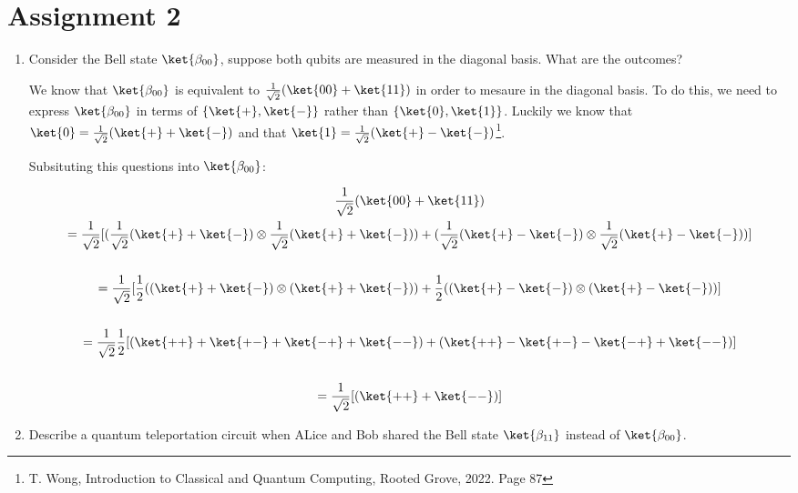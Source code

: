 \documentclass[]{article}
\begin{document}
  \section*{Assignment 2}
    \begin{enumerate}
      \item Consider the Bell state $\ket{\beta_{00}}$, suppose both qubits are measured in the diagonal basis. 
        What are the outcomes?

        We know that $\ket{\beta_{00}}$ is equivalent to $\frac{1}{\sqrt{2}}(\ket{00} + \ket{11})$ in order 
        to mesaure in the diagonal basis. To do this, we need to express $\ket{\beta_{00}}$ 
        in terms of $\{\ket{+}, \ket{-}\}$ rather than $\{\ket{0}, \ket{1}\}$.
        Luckily we know that $\ket{0} = \frac{1}{\sqrt{2}}(\ket{+} + \ket{-})$ and that
        $\ket{1} = \frac{1}{\sqrt{2}}(\ket{+} - \ket{-})$\footnote{T. Wong, Introduction to 
        Classical and Quantum Computing, Rooted Grove, 2022. Page 87}. 

        Subsituting this questions into $\ket{\beta_{00}}$:

        \begin{gather*}
          \frac{1}{\sqrt{2}}(\ket{00} + \ket{11}) \\
          = \frac{1}{\sqrt{2}}[(\frac{1}{\sqrt{2}}(\ket{+} + \ket{-}) \otimes \frac{1}{\sqrt{2}}(\ket{+} + \ket{-}))
          + (\frac{1}{\sqrt{2}}(\ket{+} - \ket{-}) \otimes \frac{1}{\sqrt{2}}(\ket{+} - \ket{-}))] \\
          \\
          = \frac{1}{\sqrt{2}}[\frac{1}{2}((\ket{+} + \ket{-}) \otimes (\ket{+} + \ket{-}))
          + \frac{1}{2}((\ket{+} - \ket{-}) \otimes (\ket{+} - \ket{-}))] \\
          \\
          = \frac{1}{\sqrt{2}}\frac{1}{2}[(\ket{++} + \ket{+-} + \ket{-+} + \ket{--})
          + (\ket{++} - \ket{+-} - \ket{-+} + \ket{--})] \\
          \\
          = \frac{1}{\sqrt{2}}[(\ket{++} + \ket{--})] \\
        \end{gather*}

      
      \item Describe a quantum teleportation circuit when ALice and Bob shared the Bell state
        $\ket{\beta_{11}}$ instead of $\ket{\beta_{00}}$.


\end{enumerate}
\end{document}
